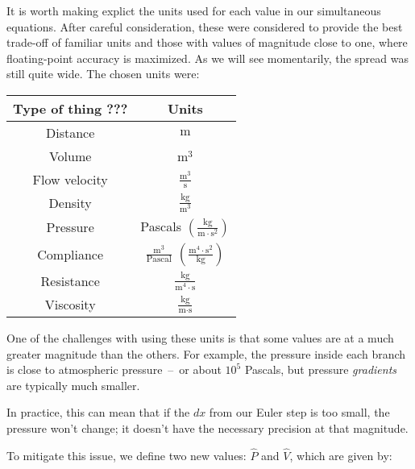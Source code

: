 It is worth making explict the units used for each value in our simultaneous equations. After
careful consideration, these were considered to provide the best trade-off of familiar units and
those with values of magnitude close to one, where floating-point accuracy is maximized. As we will
see momentarily, the spread was still quite wide. The chosen units were:

{
    \renewcommand{\arraystretch}{1.6}
    \begin{table}[h]
    \centering
    \begin{tabular}{ |c|c| }
        \hline
        Type of thing ??? & Units \\
        \hline \hline
        Distance & $\text{m}$ \\
        \hline
        Volume & $\text{m}^3$ \\
        \hline
        Flow velocity & $\frac{ \text{m}^3 }{ \text{s} }$ \\
        \hline
        Density & $\frac{ \text{kg} }{ \text{m}^3 }$ \\
        \hline
        Pressure & Pascals $\left( \frac{ \text{kg} }{ \text{m} \cdot \text{s}^2 } \right)$ \\
        \hline
        Compliance & $\frac{ \text{m}^3 }{ \text{Pascal} }$ $\left( \frac{ \text{m}^4 \cdot \text{s}^2 }{ \text{kg} } \right)$ \\
        \hline
        Resistance & $\frac{ \text{kg} }{ \text{m}^4 \cdot \text{s} }$ \\
        \hline
        Viscosity & $\frac{ \text{kg} }{ \text{m} \cdot \text{s} }$ \\
        \hline
    \end{tabular}
    \end{table}
}

One of the challenges with using these units is that some values are at a much greater magnitude
than the others. For example, the pressure inside each branch is close to atmospheric pressure~--~or
about $10^5$ Pascals, but pressure \textit{gradients} are typically much smaller.

In practice, this can mean that if the $dx$ from our Euler step is too small, the pressure won't
change; it doesn't have the necessary precision at that magnitude.

\breakpars

To mitigate this issue, we define two new values: $\hat{P}$ and $\hat{V}$, which are given by:


